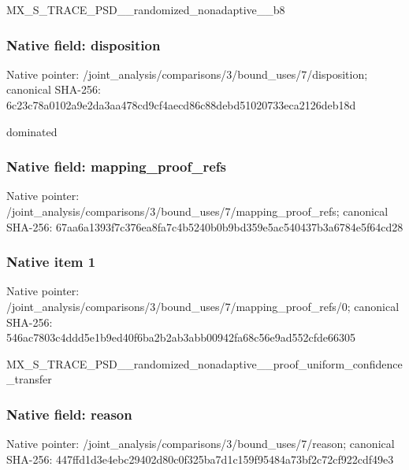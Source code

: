 \documentclass[10pt,a4paper]{article}
\begin{document}
\begingroup\raggedright\sloppy MX\_\allowbreak{}S\_\allowbreak{}TRACE\_\allowbreak{}PSD\_\allowbreak{}\_\allowbreak{}randomized\_\allowbreak{}nonadaptive\_\allowbreak{}\_\allowbreak{}b8\par\endgroup

\subsubsection{Native field: disposition}
Native pointer: /joint\_\allowbreak{}analysis/comparisons/3/bound\_\allowbreak{}uses/7/disposition; canonical SHA-256: 6c23c78a0102a9e2da3aa478cd9cf4aecd86c88debd51020733eca2126deb18d

\begingroup\raggedright\sloppy dominated\par\endgroup

\subsubsection{Native field: mapping\_\allowbreak{}proof\_\allowbreak{}refs}
Native pointer: /joint\_\allowbreak{}analysis/comparisons/3/bound\_\allowbreak{}uses/7/mapping\_\allowbreak{}proof\_\allowbreak{}refs; canonical SHA-256: 67aa6a1393f7c376ea8fa7c4b5240b0b9bd359e5ac540437b3a6784e5f64cd28

\subsubsection{Native item 1}
Native pointer: /joint\_\allowbreak{}analysis/comparisons/3/bound\_\allowbreak{}uses/7/mapping\_\allowbreak{}proof\_\allowbreak{}refs/0; canonical SHA-256: 546ac7803c4ddd5e1b9ed40f6ba2b2ab3abb00942fa68c56e9ad552cfde66305

\begingroup\raggedright\sloppy MX\_\allowbreak{}S\_\allowbreak{}TRACE\_\allowbreak{}PSD\_\allowbreak{}\_\allowbreak{}randomized\_\allowbreak{}nonadaptive\_\allowbreak{}\_\allowbreak{}proof\_\allowbreak{}uniform\_\allowbreak{}confidence\_\allowbreak{}transfer\par\endgroup

\subsubsection{Native field: reason}
Native pointer: /joint\_\allowbreak{}analysis/comparisons/3/bound\_\allowbreak{}uses/7/reason; canonical SHA-256: 447ffd1d3e4ebc29402d80c0f325ba7d1c159f95484a73bf2c72cf922cdf49e3
\end{document}
